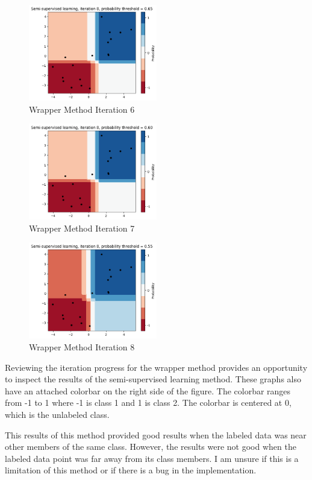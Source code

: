 \begin{figure}[H]
    \centering
    \includegraphics[width=0.5\textwidth]{images/img10.png}
    \caption{Wrapper Method Iteration 6}
    \label{fig:img10}
\end{figure}

\begin{figure}[H]
    \centering
    \includegraphics[width=0.5\textwidth]{images/img11.png}
    \caption{Wrapper Method Iteration 7}
    \label{fig:img11}
\end{figure}

\begin{figure}[H]
    \centering
    \includegraphics[width=0.5\textwidth]{images/img12.png}
    \caption{Wrapper Method Iteration 8}
    \label{fig:img12}
\end{figure}


Reviewing the iteration progress for the wrapper method provides an opportunity to inspect the results of the semi-supervised learning method. These graphs also have an attached colorbar on the right side of the figure. The colorbar ranges from -1 to 1 where -1 is class 1 and 1 is class 2. The colorbar is centered at 0, which is the unlabeled class.\par
This results of this method provided good results when the labeled data was near other members of the same class. However, the results were not good when the labeled data point was far away from its class members. I am unsure if this is a limitation of this method or if there is a bug in the implementation.

